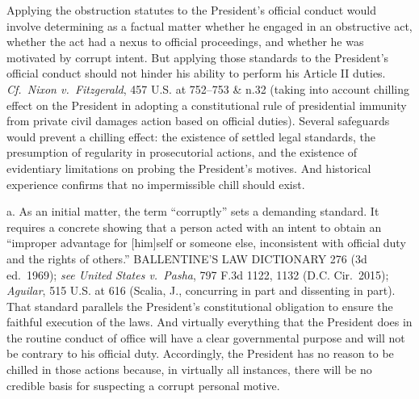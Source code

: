 Applying the obstruction statutes to the President’s official conduct would involve determining as a factual matter whether he engaged in an obstructive act, whether the act had a nexus to official proceedings, and whether he was motivated by corrupt intent.
But applying those standards to the President’s official conduct should not hinder his ability to perform his Article II duties.
\textit{Cf.~Nixon v.\ Fitzgerald}, 457 U.S. at 752--753 \& n.32 (taking into account chilling effect on the President in adopting a constitutional rule of presidential immunity from private civil damages action based on official duties).
Several safeguards would prevent a chilling effect: the existence of settled legal standards, the presumption of regularity in prosecutorial actions, and the existence of evidentiary limitations on probing the President’s motives.
And historical experience confirms that no impermissible chill should exist.

a. As an initial matter, the term “corruptly” sets a demanding standard.
It requires a concrete showing that a person acted with an intent to obtain an “improper advantage for [him]self or someone else, inconsistent with official duty and the rights of others.” BALLENTINE’S LAW DICTIONARY 276 (3d ed.~1969);
\textit{see United States v.\ Pasha}, 797 F.3d 1122, 1132 (D.C. Cir.~2015);
\textit{Aguilar}, 515 U.S. at 616 (Scalia, J., concurring in part and dissenting in part).
That standard parallels the President’s constitutional obligation to ensure the faithful execution of the laws.
And virtually everything that the President does in the routine conduct of office will have a clear governmental purpose and will not be contrary to his official duty.
Accordingly, the President has no reason to be chilled in those actions because, in virtually all instances, there will be no credible basis for suspecting a corrupt personal motive.

